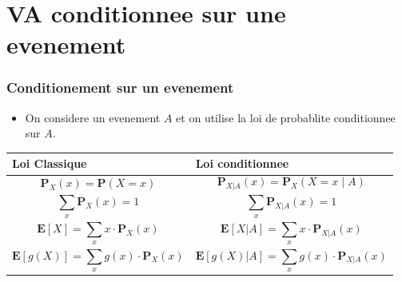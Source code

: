 \documentclass{beamer}
\renewcommand{\P}{\mathbf{P}}
\newcommand{\E}{\mathbf{E}}
\begin{document}
\section{VA conditionnee sur une evenement}
\begin{frame}[t]
  \frametitle{Conditionement sur un evenement}
  \begin{itemize}
    \small
    \item On considere un evenement $A$ et on utilise la loi de \alert{probablite
      conditionnee sur $A$}.
  \end{itemize}
  \centering
  \scriptsize
  \vspace*{1cm}
  \begin{tabular}{m{5cm}m{5cm}}
   \toprule 
   \textbf{Loi Classique} & \textbf{Loi conditionnee}\\[8pt]
   \midrule
   $$ \P_X(x) = \P(X = x)$$ &  $$\P_{X|A}(x) = \P_X( X = x\;|\; A)$$ \\[3pt]
   $$ \sum_x\P_X(x) = 1$$ &  $$\sum_x\P_{X|A}(x) = 1$$ \\[3pt]
   $$ \E[X] = \sum_x x\cdot\P_X(x)  $$ &  $$\E[X|A] = \sum_x x\cdot\P_{X|A}(x)$$ \\[3pt]
   $$ \E[g(X)] = \sum_x g(x)\cdot\P_X(x)  $$ &  $$\E[g(X)|A] = \sum_x g(x)\cdot\P_{X|A}(x)$$ \\[4pt]
   \bottomrule
\end{tabular}
\end{frame}
\end{document}
